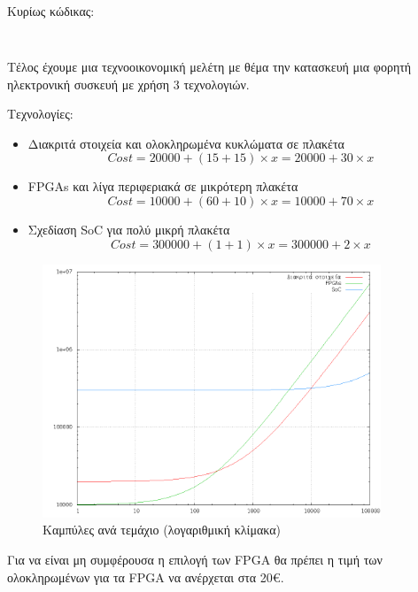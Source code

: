 \documentclass[a4paper,10pt]{article}
\begin{document}
\noindent Κυρίως κώδικας:
\inputminted[linenos,obeytabs,fontsize=\footnotesize]{nasm}{files/1-4.8085}


\subsection{}
\subsubsection*{}
Τέλος έχουμε μια τεχνοοικονομική μελέτη με θέμα την κατασκευή μια φορητή
ηλεκτρονική συσκευή με χρήση 3 τεχνολογιών.

Τεχνολογίες:
\begin{itemize}
    \item Διακριτά στοιχεία και ολοκληρωμένα κυκλώματα σε πλακέτα
        \begin{equation}
            Cost=20000+(15+15)\times{x}=20000+30\times{x}
        \end{equation}
    \item FPGAs και λίγα περιφεριακά σε μικρότερη πλακέτα
        \begin{equation}
            Cost=10000+(60+10)\times{x}=10000+70\times{x}
        \end{equation}
    \item Σχεδίαση SoC για πολύ μικρή πλακέτα
        \begin{equation}
            Cost=300000+(1+1)\times{x}=300000+2\times{x}
        \end{equation}
\end{itemize}

\begin{figure}[H] 
     \includegraphics[width=0.9\textwidth]{files/plot1.png}
     \caption{Καμπύλες ανά τεμάχιο (λογαριθμική κλίμακα)}
\end{figure}
Για να είναι μη συμφέρουσα η επιλογή των FPGA θα πρέπει η τιμή των
ολοκληρωμένων για τα FPGA να ανέρχεται στα 20\euro.
\end{document}
